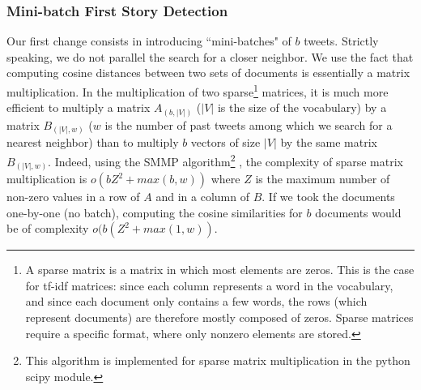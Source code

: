 \subsubsection{Mini-batch First Story Detection}
\label{Subsec: FSD}
 Our first change consists in introducing ``mini-batches" of $b$ tweets. Strictly speaking, we do not parallel the search for a closer neighbor. We use the fact that 
computing cosine distances between two sets of documents is essentially a matrix multiplication. In the multiplication of two sparse\footnote{A sparse matrix is a matrix in which most elements are zeros. This is the case for tf-idf matrices: since each column represents a word in the vocabulary, and since each document only contains a few words, the rows (which represent documents) are therefore mostly composed of zeros. Sparse matrices require a specific format, where only nonzero elements are stored.} matrices, it is much more efficient to multiply a matrix $A_{(b,|V|)}$ ($|V|$ is the size of the vocabulary) by a matrix $B_{(|V|,w)}$ ($w$ is the number of past tweets among which we search for a nearest neighbor) than to multiply $b$ vectors of size $|V|$ by the same matrix $B_{(|V|,w)}$. Indeed, using the SMMP algorithm\footnote{This algorithm is implemented for sparse matrix multiplication in the python scipy module.} \citep{banks_sparse_1993}, the complexity of sparse matrix multiplication is $o(bZ^2 + max(b,w))$  where $Z$ is the maximum number of non-zero values in a row of $A$ and in a column of $B$. If we took the documents one-by-one (no batch), computing the cosine similarities for $b$ documents would be of complexity $o(b(Z
^2 + max(1, w))$.
 
